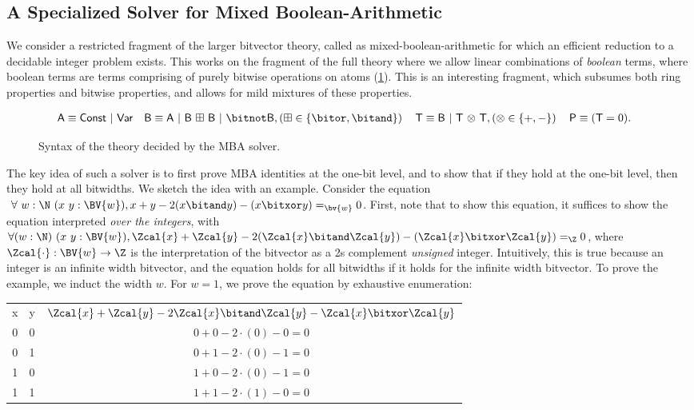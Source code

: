 \subsection{A Specialized Solver for Mixed Boolean-Arithmetic}
\label{sec:swbv:mba}

We consider a restricted fragment of the larger bitvector theory, called as mixed-boolean-arithmetic \cite{liu2021mba}
for which an efficient reduction to a decidable integer problem exists.
This works on the fragment of the full theory where we allow linear combinations of \emph{boolean} terms,
where boolean terms are terms comprising of purely bitwise operations on atoms (\cref{fig:swbv:mba-syntax}).
This is an interesting fragment, which subsumes both ring properties and bitwise properties,
and allows for mild mixtures of these properties.

\begin{figure}[htb]
\begin{align*}
&\mathsf{A} \equiv
  \mathsf{Const} ~|~ \mathsf{Var}
\quad \mathsf{B}
  \equiv \mathsf{A} ~|~
  \mathsf{B} ~\mathsf{\boxplus}~ \mathsf{B} ~|~
  \bitnot \mathsf{B}, \left(\boxplus \in \{\bitor, \bitand\}\right)
\quad \mathsf{T}
  \equiv \mathsf{B} ~|~
  \mathsf{T} ~\mathsf{\otimes}~ \mathsf{T}, \left(\otimes \in \{+, - \}\right)
\quad \mathsf{P} \equiv (\mathsf{T} = 0).
\end{align*}
\caption{Syntax of the theory decided by the MBA solver. }
\label{fig:swbv:mba-syntax}
\end{figure}

The key idea of such a solver is to first prove MBA identities at the one-bit level,
and to show that if they hold at the one-bit level, then they hold at all bitwidths.
We sketch the idea with an example.
Consider the equation $~\forall~{w : \N}~(x~y : \BV{w}),x + y - 2 (x \bitand y) - (x \bitxor y) =_{\bv{w}} 0$.
First, note that to show this equation, it suffices to show the equation interpreted \emph{over the integers},
with $\forall (w : \N)~(x~y : \BV{w}), \Zcal{x} + \Zcal{y} - 2 (\Zcal{x} \bitand \Zcal{y}) - (\Zcal{x} \bitxor \Zcal{y}) =_{\Z} 0$,
where $\Zcal{\cdot} : \BV{w} \to \Z$ is the interpretation of the bitvector as a 2s complement \emph{unsigned} integer.
Intuitively, this is true because an integer is an infinite width bitvector,
and the equation holds for all bitwidths if it holds for the infinite width bitvector.
To prove the example, we induct the width $w$.
For $w = 1$, we prove the equation by exhaustive enumeration:

\begin{tabular}{ccc}
\rowcolor{gray!10}
  x & y & $\Zcal{x} + \Zcal{y} - 2 \Zcal{x} \bitand \Zcal{y} - \Zcal{x} \bitxor \Zcal{y}$ \\
  0 & 0 & $0 + 0 - 2 \cdot (0) - 0 = 0$ \\
\rowcolor{gray!10}
  0 & 1 & $0 + 1 - 2 \cdot (0) - 1 = 0$ \\
  1 & 0 & $1 + 0 - 2 \cdot (0) - 1 = 0$ \\
\rowcolor{gray!10}
  1 & 1 & $1 + 1 - 2 \cdot (1) - 0 = 0$
\end{tabular}


